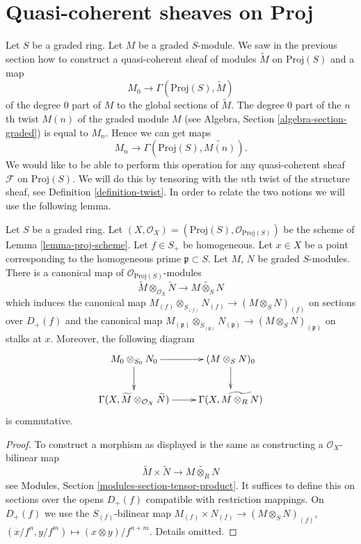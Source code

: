\section{Quasi-coherent sheaves on Proj}
\label{section-quasi-coherent-proj}

\noindent
Let $S$ be a graded ring. Let $M$ be a graded $S$-module.
We saw in the previous section how to construct a quasi-coherent
sheaf of modules $\widetilde{M}$ on $\text{Proj}(S)$ and a map
$$
M_0 \longrightarrow \Gamma(\text{Proj}(S), \widetilde{M})
$$
of the degree $0$ part of $M$ to the global sections of $\widetilde{M}$.
The degree $0$ part of the $n$th twist $M(n)$ of the graded module $M$ (see
Algebra, Section \ref{algebra-section-graded})
is equal to $M_n$. Hence we can get maps
$$
M_n \longrightarrow \Gamma(\text{Proj}(S), \widetilde{M(n)}).
$$
We would like to be able to perform this operation for any quasi-coherent
sheaf $\mathcal{F}$ on $\text{Proj}(S)$. We will do this by tensoring
with the $n$th twist of the structure sheaf, see
Definition \ref{definition-twist}. In order to relate the two notions
we will use the following lemma.

\begin{lemma}
\label{lemma-widetilde-tensor}
Let $S$ be a graded ring.
Let $(X, \mathcal{O}_X) = (\text{Proj}(S), \mathcal{O}_{\text{Proj}(S)})$
be the scheme of Lemma \ref{lemma-proj-scheme}.
Let $f \in S_{+}$ be homogeneous. Let $x \in X$ be a point
corresponding to the homogeneous prime $\mathfrak p \subset S$.
Let $M$, $N$ be graded $S$-modules.
There is a canonical map of $\mathcal{O}_{\text{Proj}(S)}$-modules
$$
\widetilde M \otimes_{\mathcal{O}_X} \widetilde N
\longrightarrow
\widetilde{M \otimes_S N}
$$
which induces the canonical map
$
M_{(f)} \otimes_{S_{(f)}} N_{(f)}
\to
(M \otimes_S N)_{(f)}
$
on sections over $D_{+}(f)$ and the canonical map
$
M_{(\mathfrak p)} \otimes_{S_{(\mathfrak p)}} N_{(\mathfrak p)}
\to
(M \otimes_S N)_{(\mathfrak p)}
$
on stalks at $x$. Moreover, the following diagram
$$
\xymatrix{
M_0 \otimes_{S_0} N_0 \ar[r] \ar[d] &
(M \otimes_S N)_0 \ar[d] \\
\Gamma(X, \widetilde M \otimes_{\mathcal{O}_X} \widetilde N) \ar[r] &
\Gamma(X, \widetilde{M \otimes_R N})
}
$$
is commutative.
\end{lemma}

\begin{proof}
To construct a morphism as displayed is the same as constructing
a $\mathcal{O}_X$-bilinear map
$$
\widetilde M \times \widetilde N
\longrightarrow
\widetilde{M \otimes_R N}
$$
see Modules, Section \ref{modules-section-tensor-product}.
It suffices to define this on sections over the opens $D_{+}(f)$
compatible with restriction mappings. On $D_{+}(f)$ we use the
$S_{(f)}$-bilinear map
$M_{(f)} \times N_{(f)} \to (M \otimes_S N)_{(f)}$,
$(x/f^n, y/f^m) \mapsto (x \otimes y)/f^{n + m}$. Details omitted.
\end{proof}

